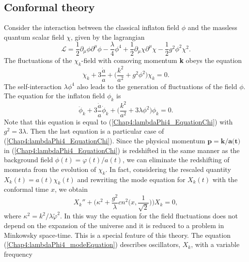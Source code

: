\documentclass[11pt,a4paper,twoside]{book}
\begin{document}
 \subsection{Conformal theory}
 Consider the interaction between the classical inflaton field $\phi$ and the massless quantum scalar field $\chi$, given by the lagrangian
 \begin{equation}
\label{Chap4:lambdaPhi4_Lagrangian}
\mathcal{L}=\frac{1}{2}\partial_{\mu}\phi\partial^{\mu}\phi - \frac{\lambda }{4}\phi^{4} + \frac{1}{2}\partial_{\mu}\chi\partial^{\mu}\chi - \frac{1}{2}g^{2}\phi^{2}\chi^{2}.
 \end{equation}
 The fluctuations of the $\chi_{k}$-field with comoving momentum \textbf{k} obeys the equation
 \begin{equation}
\label{Chap4:lambdaPhi4_EquationChi}
\ddot{\chi}_{k} + 3\frac{\dot{a}}{a} + \Bigg(\frac{k^{2}}{a^{2}} + g^{2}\phi^{2}\Bigg)\chi_{k}= 0.
 \end{equation}
 The self-interaction $\lambda\phi^{4}$ also leads to the generation of fluctuations of the field $\phi$. The equation for the inflaton field $\phi_{k}$
is 
\begin{equation}
\label{Chap4:lambdaPhi4_EquationPhik}
\ddot{\phi}_{k} + 3\frac{\dot{a}}{a}\dot{\phi}_{k} + \Bigg(\frac{k^{2}}{a^{2}} + 3\lambda\phi^{2}\Bigg) \phi_{k}= 0.
\end{equation} 
Note that this equation is equal to (\ref{Chap4:lambdaPhi4_EquationChi}) with $ g^{2}=3\lambda $. Then the last equation is a particular case of (\ref{Chap4:lambdaPhi4_EquationChi}). Since the physical momentum $ \textbf{p}=\textbf{k}/\textbf{a(t)} $ in (\ref{Chap4:lambdaPhi4_EquationChi}) is redshifted in the same manner as the background field $ \phi(t) = \varphi(t)/a(t) $, we can eliminate the redshifting of momenta from the evolution of $\chi_{k}$. In fact, considering the rescaled quantity $ X_{k}(t) = a(t)\chi_{k}(t) $ and rewriting the mode equation for $ X_{k}(t) $ with the conformal time $ x $, we obtain
\begin{equation}
\label{Chap4:lambdaPhi4_modeEquation}
X_{k}'' + \Bigg(\kappa^{2} + \frac{g^{2}}{\lambda}cn^{2}\Bigg(x,\frac{1}{\sqrt{2}}\Bigg)\Bigg)X_{k} = 0,
\end{equation}
where $\kappa^{2}=k^{2}/\lambda \tilde{\varphi}^{2}$. In this way the equation for the field fluctuations does not depend on the expansion of the universe and it is reduced to a problem in Minkowsky space-time. This is a special feature of this theory. The equation (\ref{Chap4:lambdaPhi4_modeEquation}) describes oscillators, $ X_{k} $, with a variable frequency
\end{document}
